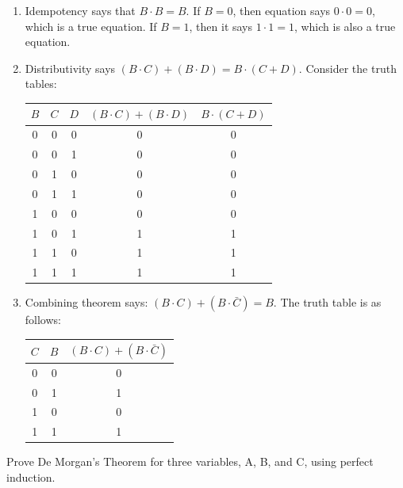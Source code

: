 \documentclass[12pt]{article}
\newenvironment{ex}[2][Exercise]{\begin{trivlist}
		\item[\hskip \labelsep {\bfseries #1}\hskip \labelsep {\bfseries #2.}]}{\end{trivlist}}
\newenvironment{sol}[1][Solution]{\begin{trivlist}
		\item[\hskip \labelsep {\bfseries #1:}]}{\end{trivlist}}
\begin{document}
\begin{sol}
	\begin{enumerate}[label=(\alph*)]
		\item Idempotency says that $B\cdot B=B$. If $B=0$, then equation says $0\cdot 0=0$, which is a true equation. If $B=1$, then it says $1\cdot 1 =1$, which is also a true equation.
		\item Distributivity says $(B\cdot C)+(B\cdot D)=B\cdot (C+D)$.
		Consider the truth tables:
		\begin{center}
			\begin{tabular}{ccc|c|c}
				$B$ & $C$ & $D$ & $(B\cdot C)+(B\cdot D)$ & $B\cdot (C+D)$\\
				\hline
				0 & 0 & 0 & 0 & 0\\
				0 & 0 & 1 & 0 & 0\\
				0 & 1 & 0 & 0 & 0\\
				0 & 1 & 1 & 0 & 0\\
				1 & 0 & 0 & 0 & 0\\
				1 & 0 & 1 & 1 & 1\\
				1 & 1 & 0 & 1 & 1\\
				1 & 1 & 1 & 1 & 1\\
			\end{tabular}
		\end{center}
		\item Combining theorem says: $(B\cdot C)+(B\cdot \bar{C})=B$.
		The truth table is as follows:
		\begin{center}
			\begin{tabular}{cc|c}
				$C$ & $B$ & $(B\cdot C)+(B\cdot \bar{C})$\\
				\hline
				0 & 0 & 0\\
				0 & 1 & 1\\
				1 & 0 & 0\\
				1 & 1 & 1\\
			\end{tabular}
		\end{center}
	\end{enumerate}
\end{sol}

\begin{ex}{2.23}
	Prove De Morgan's Theorem for three variables, A, B, and C, using perfect induction.
\end{ex}
\end{document}
